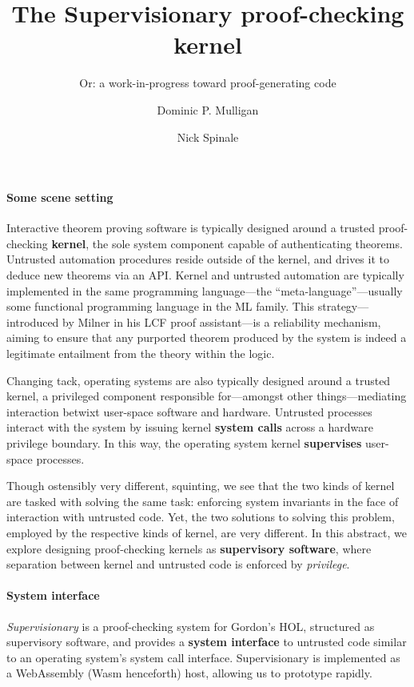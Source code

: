 \documentclass[sigplan, review]{acmart}
\title{The Supervisionary proof-checking kernel}
\subtitle{Or: a work-in-progress toward proof-generating code}
\author{Dominic P. Mulligan}
\affiliation{
  \institution{Systems Research Group, Arm Research}
  \streetaddress{Fulbourn Road}
  \city{Cambridge}
  \country{United Kingdom}
}
\author{Nick Spinale}
\affiliation{
  \institution{Systems Research Group, Arm Research}
  \streetaddress{Fulbourn Road}
  \city{Cambridge}
  \country{United Kingdom}
}
\newcommand{\deffont}[1]{\textbf{#1}}
\begin{document}
\maketitle

\paragraph{Some scene setting}

Interactive theorem proving software is typically designed around a trusted proof-checking \deffont{kernel}, the sole system component capable of authenticating theorems.
Untrusted automation procedures reside outside of the kernel, and drives it to deduce new theorems via an API.
Kernel and untrusted automation are typically implemented in the same programming language---the ``meta-language''---usually some functional programming language in the ML family.
This strategy---introduced by Milner in his LCF proof assistant---is a reliability mechanism, aiming to ensure that any purported theorem produced by the system is indeed a legitimate entailment from the theory within the logic.

Changing tack, operating systems are also typically designed around a trusted kernel, a privileged component responsible for---amongst other things---mediating interaction betwixt user-space software and hardware.
Untrusted processes interact with the system by issuing kernel \deffont{system calls} across a hardware privilege boundary.
In this way, the operating system kernel \deffont{supervises} user-space processes.

Though ostensibly very different, squinting, we see that the two kinds of kernel are tasked with solving the same task: enforcing system invariants in the face of interaction with untrusted code.
Yet, the two solutions to solving this problem, employed by the respective kinds of kernel, are very different.
In this abstract, we explore designing proof-checking kernels as \deffont{supervisory software}, where separation between kernel and untrusted code is enforced by \emph{privilege}.

\paragraph{System interface}

\emph{Supervisionary} is a proof-checking system for Gordon's HOL, structured as supervisory software, and provides a \deffont{system interface} to untrusted code similar to an operating system's system call interface.
Supervisionary is implemented as a WebAssembly (Wasm henceforth) host, allowing us to prototype rapidly.
\end{document}
